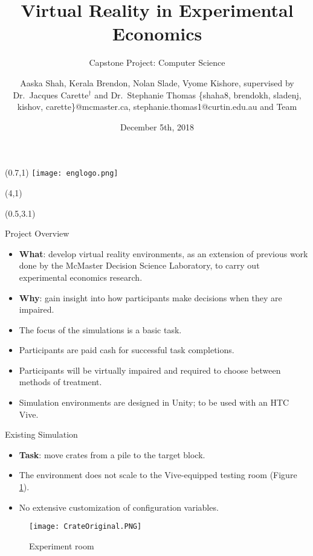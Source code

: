 \documentclass[22pt]{beamer}
\title{Virtual Reality in Experimental Economics}
\subtitle{Capstone Project: Computer Science}
\author[Shah, Brendon, Slade, Kishore \& Carette]{Aaska Shah, Kerala Brendon, Nolan Slade, Vyome Kishore, supervised by Dr.~Jacques Carette$^\dagger$ and Dr.~Stephanie Thomas \vspace{0.3cm} \newline \small \{shaha8, brendokh, sladenj, kishov, carette\}@mcmaster.ca, stephanie.thomas1@curtin.edu.au and Team}
\institute[McMaster University]{$^\dagger$Department of Computing and Software, McMaster University

1280 Main St. W, Hamilton, Ontario, Canada L8S 4L8}
\date{December 5th, 2018}
\begin{document}

\begin{frame}[fragile]

\begin{textblock}{2}(0.7,1)
\texttt{[image: englogo.png]} %
\end{textblock}

\begin{textblock}{8}(4,1)
\titlepage
\end{textblock}

\begin{textblock}{7.25}(0.5,3.1)

\begin{block}{Project Overview}\newline
\begin{itemize}
\item \textbf{What}: develop virtual reality environments, as an extension of previous work done by the McMaster Decision Science Laboratory, to carry out experimental economics research.
\item \textbf{Why}: gain insight into how participants make decisions when they are impaired.
\item The focus of the simulations is a basic task.
\item Participants are paid cash for successful task completions.
\item Participants will be virtually impaired and required to choose between methods of treatment.
\item Simulation environments are designed in Unity; to be used with an HTC Vive. 
\end{itemize}
\end{block}

\begin{block}{Existing Simulation}\newline
\begin{itemize}
\item \textbf{Task}: move crates from a pile to the target block.
\item The environment does not scale to the Vive-equipped testing room (Figure \ref{fig:crate}).
\item No extensive customization of configuration variables.
\end{itemize}
\newline
\begin{figure}
  \texttt{[image: CrateOriginal.PNG]}
  \caption{Experiment room}
\label{fig:crate}
\end{figure}
\end{block}



\end{textblock}
\end{frame}
\end{document}
